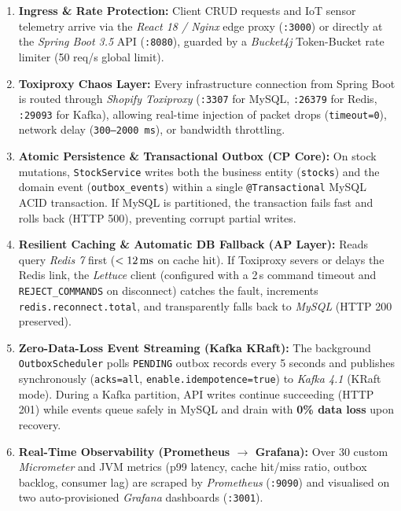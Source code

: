 \documentclass[12pt,a4paper,twoside]{article}
\newcommand{\tech}[1]{\textit{#1}}
\begin{document}
\begin{enumerate}[leftmargin=1.8cm, label=\textbf{Step \arabic*:}]
  \item \textbf{Ingress \& Rate Protection:} Client CRUD requests and IoT sensor telemetry arrive via the \tech{React 18 / Nginx} edge proxy (\texttt{:3000}) or directly at the \tech{Spring Boot 3.5} API (\texttt{:8080}), guarded by a \tech{Bucket4j} Token-Bucket rate limiter (50 req/s global limit).
  \item \textbf{Toxiproxy Chaos Layer:} Every infrastructure connection from Spring Boot is routed through \tech{Shopify Toxiproxy} (\texttt{:3307} for MySQL, \texttt{:26379} for Redis, \texttt{:29093} for Kafka), allowing real-time injection of packet drops (\texttt{timeout=0}), network delay (\texttt{300--2000\,ms}), or bandwidth throttling.
  \item \textbf{Atomic Persistence \& Transactional Outbox (CP Core):} On stock mutations, \texttt{StockService} writes both the business entity (\texttt{stocks}) and the domain event (\texttt{outbox\_events}) within a single \texttt{@Transactional} MySQL ACID transaction. If MySQL is partitioned, the transaction fails fast and rolls back (HTTP 500), preventing corrupt partial writes.
  \item \textbf{Resilient Caching \& Automatic DB Fallback (AP Layer):} Reads query \tech{Redis 7} first ($<12\text{\,ms}$ on cache hit). If Toxiproxy severs or delays the Redis link, the \tech{Lettuce} client (configured with a 2\,s command timeout and \texttt{REJECT\_COMMANDS} on disconnect) catches the fault, increments \texttt{redis.reconnect.total}, and transparently falls back to \tech{MySQL} (HTTP 200 preserved).
  \item \textbf{Zero-Data-Loss Event Streaming (Kafka KRaft):} The background \texttt{OutboxScheduler} polls \texttt{PENDING} outbox records every 5 seconds and publishes synchronously (\texttt{acks=all}, \texttt{enable.idempotence=true}) to \tech{Kafka 4.1} (KRaft mode). During a Kafka partition, API writes continue succeeding (HTTP 201) while events queue safely in MySQL and drain with \textbf{0\% data loss} upon recovery.
  \item \textbf{Real-Time Observability (Prometheus $\to$ Grafana):} Over 30 custom \tech{Micrometer} and JVM metrics (p99 latency, cache hit/miss ratio, outbox backlog, consumer lag) are scraped by \tech{Prometheus} (\texttt{:9090}) and visualised on two auto-provisioned \tech{Grafana} dashboards (\texttt{:3001}).
\end{enumerate}
\end{document}
